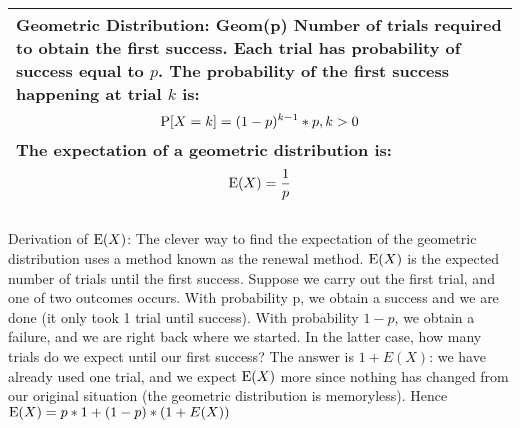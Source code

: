 {\tabulinesep=1mm
\begin{tabu}{|p{16cm} |}
\hline
\vspace{2 mm}
\textbf{Geometric Distribution: Geom(p)}
Number of trials required to obtain the first success. Each trial has 
probability of success equal to $p$. The probability of the first success 
happening at trial $k$ is:
\[ \P[X = k] = (1 - p)^{k - 1}*p, k > 0\]
The expectation of a geometric distribution is:
\[\E(X) = \frac{1}{p}\]
\vspace{5 mm}
\\
\hline
\end{tabu}
}

\begin{solution} %
Derivation of $\E(X)$:
The clever way to find the expectation of the geometric distribution 
uses a method known as the renewal method. $\E(X)$ is the expected number 
of trials until the first success. Suppose we carry out the first trial,
and one of two outcomes occurs. With probability p, we obtain a success 
and we are done (it only took 1 trial until success). With probability 
$1 - p$, we obtain a failure, and we are right back where we started. 
In the latter case, how many trials do we expect until our first success? 
The answer is $1 + E(X)$: we have already used one trial, and we expect 
$\E(X)$ more since nothing has changed from our original situation 
(the geometric distribution is memoryless). Hence 
$\E(X) = p * 1 + (1 - p) * (1 + E(X))$
\end{solution}